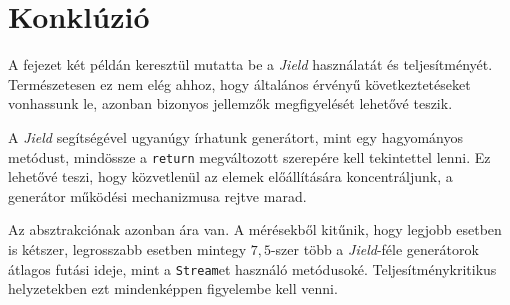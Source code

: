 \section{Konklúzió}

A fejezet két példán keresztül mutatta be a \textit{Jield} használatát és teljesítményét. Természetesen ez nem elég ahhoz, hogy általános érvényű következtetéseket vonhassunk le, azonban bizonyos jellemzők megfigyelését lehetővé teszik.

A \textit{Jield} segítségével ugyanúgy írhatunk generátort, mint egy hagyományos metódust, mindössze a \texttt{return} megváltozott szerepére kell tekintettel lenni. Ez lehetővé teszi, hogy közvetlenül az elemek előállítására koncentráljunk, a generátor működési mechanizmusa rejtve marad.

Az absztrakciónak azonban ára van. A mérésekből kitűnik, hogy legjobb esetben is kétszer, legrosszabb esetben mintegy $7,5$-szer több a \textit{Jield}-féle generátorok átlagos futási ideje, mint a \texttt{Stream}et használó metódusoké. Teljesítménykritikus helyzetekben ezt mindenképpen figyelembe kell venni.
